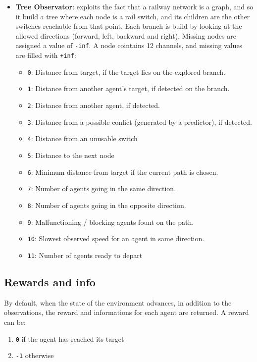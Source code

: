 \documentclass[13pt]{article}
\begin{document}
\begin{itemize}
    \item \textbf{Tree Observator}: exploits the fact that a railway network is a graph, and so it build a tree where each node is a rail switch, and its children are the other switches reachable from that point. Each branch is build by looking at the allowed directions (forward, left, backward and right). Missing nodes are assigned a value of \texttt{-inf}. A node cointains 12 channels, and missing values are filled with \texttt{+inf}:
    \begin{itemize}
        \item \texttt{0}: Distance from target, if the target lies on the explored branch.
        \item \texttt{1}: Distance from another agent's target, if detected on the branch.
        \item \texttt{2}: Distance from another agent, if detected.
        \item \texttt{3}: Distance from a possible confict (generated by a predictor), if detected.
        \item \texttt{4}: Distance from an unusable switch
        \item \texttt{5}: Distance to the next node
        \item \texttt{6}: Minimum distance from target if the current path is chosen.
        \item \texttt{7}: Number of agents going in the same direction.
        \item \texttt{8}: Number of agents going in the opposite direction.
        \item \texttt{9}: Malfunctioning / blocking agents fount on the path.
        \item \texttt{10}: Slowest observed speed for an agent in same direction.
        \item \texttt{11}: Number of agents ready to depart
    \end{itemize}
\end{itemize}

\subsection{Rewards and info}
By default, when the state of the environment advances, in addition to the observations, the reward and informations for each agent are returned. A reward can be:
\begin{enumerate}
    \item \texttt{0} if the agent has reached its target
    \item \texttt{-1} otherwise
\end{enumerate}
\end{document}
